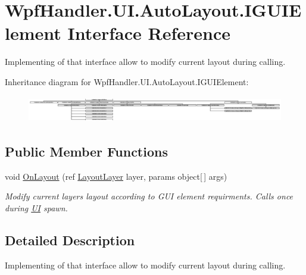 \hypertarget{interface_wpf_handler_1_1_u_i_1_1_auto_layout_1_1_i_g_u_i_element}{}\section{Wpf\+Handler.\+U\+I.\+Auto\+Layout.\+I\+G\+U\+I\+Element Interface Reference}
\label{interface_wpf_handler_1_1_u_i_1_1_auto_layout_1_1_i_g_u_i_element}


Implementing of that interface allow to modify current layout during calling.  


Inheritance diagram for Wpf\+Handler.\+U\+I.\+Auto\+Layout.\+I\+G\+U\+I\+Element\+:\begin{figure}[H]
\begin{center}
\leavevmode
\includegraphics[height=1.171242cm]{da/db2/interface_wpf_handler_1_1_u_i_1_1_auto_layout_1_1_i_g_u_i_element}
\end{center}
\end{figure}
\subsection*{Public Member Functions}
\begin{DoxyCompactItemize}
\item 
void \mbox{\hyperlink{interface_wpf_handler_1_1_u_i_1_1_auto_layout_1_1_i_g_u_i_element_a0ff16956f8e8187d51e1b36b6b9f894e}{On\+Layout}} (ref \mbox{\hyperlink{class_wpf_handler_1_1_u_i_1_1_auto_layout_1_1_layout_layer}{Layout\+Layer}} layer, params object\mbox{[}$\,$\mbox{]} args)
\begin{DoxyCompactList}\small\item\em Modify current layer\textquotesingle{}s layout according to G\+UI element requirments. Calls once during \mbox{\hyperlink{namespace_wpf_handler_1_1_u_i}{UI}} spawn. \end{DoxyCompactList}\end{DoxyCompactItemize}


\subsection{Detailed Description}
Implementing of that interface allow to modify current layout during calling. 



